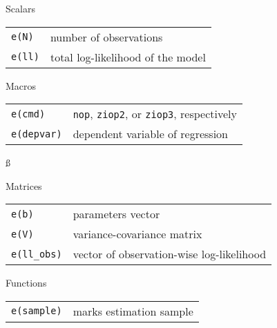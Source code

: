 \documentclass[letterpaper,fleqn,12pt]{article}
\begin{document}
Scalars

\begin{tabular}{p{3cm}p{12cm}}
\texttt{e(N)} & number of observations \\ 
\texttt{e(ll)} & total log-likelihood of the model%
\end{tabular}

Macros

\begin{tabular}{p{3.12cm}p{12cm}}
\texttt{e(cmd)} & \texttt{nop}, \texttt{ziop2}, or \texttt{ziop3},
respectively \\ 
\texttt{e(depvar)} & dependent variable of regression%
\end{tabular}%
\ss 

Matrices

\begin{tabular}{p{3cm}p{12cm}}
\texttt{e(b)} & parameters vector \\ 
\texttt{e(V)} & variance-covariance matrix \\ 
\texttt{e(ll\_obs)} & vector of observation-wise log-likelihood%
\end{tabular}

Functions

\begin{tabular}{p{3cm}p{12cm}}
\texttt{e(sample)} & marks estimation sample%
\end{tabular}

\bigskip
\end{document}
